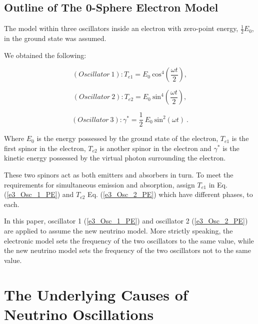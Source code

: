 \documentclass[%
 reprint,
 amsmath,amssymb,
 aps,
]{revtex4-1}
\numberwithin{equation}{section}%
\begin{document}
\subsection{Outline of The 0-Sphere Electron Model}

The model within three oscillators inside an electron with zero-point energy, $\frac{1}{2} E_0$, in the ground state was assumed.

We obtained the following:

        \begin{equation}
                (Oscillator \ 1): T_{e1} = E_{0}  \ \mathrm{cos}^{4} \left( \frac{\omega t}{2} \right)
                    ,
                \label{e3_Osc_1_PE}
        \end{equation}

        \begin{equation}
                (Oscillator \ 2): T_{e2} = E_{0}  \ \mathrm{sin}^{4} \left( \frac{\omega t}{2} \right)
                    ,
                \label{e3_Osc_2_PE}
        \end{equation}

        \begin{equation}
                (Oscillator \ 3):  \gamma^{*} = \frac{1}{2} \ E_{0} \ \mathrm{sin}^{2} (\omega t)
                    \ .
                \label{e3_Osc_3_KE}  
        \end{equation}

Where $E_0$ is the energy possessed by the ground state of the electron, $T_{e1}$ is the first spinor in the electron, $T_{e2}$ is another spinor in the electron and $\gamma^{*}$ is the kinetic energy possessed by the virtual photon surrounding the electron.

These two spinors act as both emitters and absorbers in turn. To meet the requirements for simultaneous emission and absorption, assign $T_{e1}$ in Eq. (\ref{e3_Osc_1_PE}) and $T_{e2}$ Eq. (\ref{e3_Osc_2_PE}) which have different phases, to each.

In this paper, oscillator 1 (\ref{e3_Osc_1_PE}) and oscillator 2 (\ref{e3_Osc_2_PE}) are applied to assume the new neutrino model. More strictly speaking, the electronic model sets the frequency of the two oscillators to the same value, while the new neutrino model sets the frequency of the two oscillators not to the same value.





\section{\label{sec:The Underlying Causes of Neutrino Oscillations}The Underlying Causes of Neutrino Oscillations}
\end{document}
